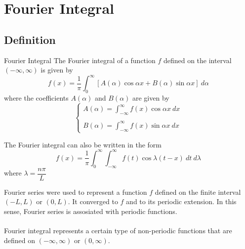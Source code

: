 \documentclass[12pt]{article}
\numberwithin{equation}{subsection}
\begin{document}

\section{Fourier Integral}

\subsection{Definition}
\begin{definition}{Fourier Integral}{}
    The Fourier integral of a function $f$ defined on the interval $(-\infty,\infty)$ is given by
    \begin{equation}
        f(x) = \frac{1}{\pi} \int_{0}^{\infty} { \left[ A(\alpha) \cos{\alpha x} + B(\alpha) \sin{\alpha x} \right] } \: d{\alpha}
    \end{equation}
    where the coefficients $A(\alpha)$ and $B(\alpha)$ are given by
    \begin{equation}
        \begin{cases}
            \displaystyle A(\alpha) = \int_{-\infty}^{\infty} {f(x) \cos{\alpha x}} \: d{x} \\\\
            \displaystyle B(\alpha) = \int_{-\infty}^{\infty} {f(x) \sin{\alpha x}} \: d{x}
        \end{cases}
    \end{equation}

    The Fourier integral can also be written in the form
    \begin{equation}
        f(x) = \frac{1}{\pi} \int_{0}^{\infty} \int_{-\infty}^{\infty} {f(t)\cos{\lambda(t-x)}} \: d{t} \: d{\lambda}
    \end{equation}
    where $\lambda = \dfrac{n\pi}{L}$
\end{definition}

Fourier series were used to represent a function $f$ defined on the finite interval $(-L,L)$ or $(0,L)$. It converged to $f$ and to its periodic extension. In this sense, Fourier series is assosiated with periodic functions.\\~\\

Fourier integral represents a certain type of non-periodic functions that are defined on $(-\infty,\infty)$ or $(0,\infty)$.
\end{document}
